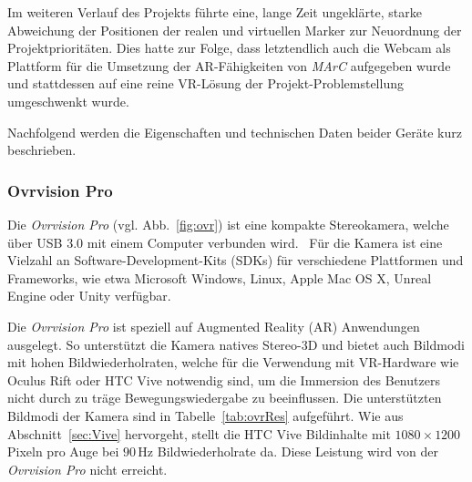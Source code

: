Im weiteren Verlauf des Projekts führte eine, lange Zeit ungeklärte, starke Abweichung der Positionen der realen und virtuellen Marker zur Neuordnung der Projektprioritäten. Dies hatte zur Folge, dass letztendlich auch die Webcam als Plattform für die Umsetzung der AR-Fähigkeiten von \emph{MArC} aufgegeben wurde und stattdessen auf eine reine VR-Lösung der Projekt-Problemstellung umgeschwenkt wurde.

Nachfolgend werden die Eigenschaften und technischen Daten beider Geräte kurz beschrieben.
\subsubsection{Ovrvision Pro}\label{sec:ovrvision}
Die \emph{Ovrvision Pro} (vgl. Abb.~\ref{fig:ovr}) ist eine kompakte Stereokamera, welche über USB 3.0 mit einem Computer verbunden wird.~\cite{website:ovrvision} Für die Kamera ist eine Vielzahl an Software-Development-Kits (SDKs) für verschiedene Plattformen und Frameworks, wie etwa Microsoft Windows, Linux, Apple Mac OS X, Unreal Engine oder Unity verfügbar.~\cite{website:ovrvisionSetup}

Die \emph{Ovrvision Pro} ist speziell auf Augmented Reality (AR) Anwendungen ausgelegt. So unterstützt die Kamera natives Stereo-3D und bietet auch Bildmodi mit hohen Bildwiederholraten, welche für die Verwendung mit VR-Hardware wie Oculus Rift oder HTC Vive notwendig sind, um die Immersion des Benutzers nicht durch zu träge Bewegungswiedergabe zu beeinflussen. Die unterstützten Bildmodi der Kamera sind in Tabelle~\ref{tab:ovrRes} aufgeführt. Wie aus Abschnitt~\ref{sec:Vive} hervorgeht, stellt die HTC Vive Bildinhalte mit $1080\times1200$\,Pixeln pro Auge bei $90$\,Hz Bildwiederholrate da. Diese Leistung wird von der \emph{Ovrvision Pro} nicht erreicht.

